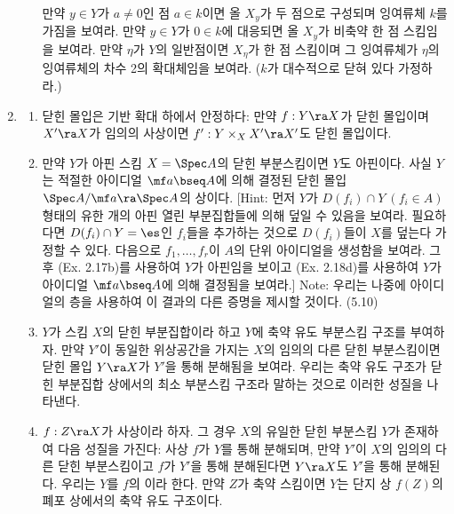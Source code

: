 \begin{enumerate}[label=\tb{3.\arabic*.},itemindent=0mm,itemsep=2mm]
\begin{enumerate}[label=(\alph*)]
	만약 $y\in Y$가 $a\ne 0$인 점 $a\in k$이면 올 $X_y$가 두 점으로 구성되며 잉여류체 $k$를 가짐을 보여라.
	만약 $y\in Y$가 $0\in k$에 대응되면 올 $X_y$가 비축약 한 점 스킴임을 보여라.
	만약 $\eta$가 $Y$의 일반점이면 $X_\eta$가 한 점 스킴이며 그 잉여류체가 $\eta$의 잉여류체의 차수 2의 확대체임을 보여라.
	($k$가 대수적으로 닫혀 있다 가정하라.)
	\end{enumerate}
	\item {}
	\begin{enumerate}[label=(\alph*)]
	\item 닫힌 몰입은 기반 확대 하에서 안정하다: 만약 $f:Y\ra X$가 닫힌 몰입이며 $X'\ra X$가 임의의 사상이면
	$f':Y\times_XX'\ra X'$도 닫힌 몰입이다.
	\end{enumerate}
	\begin{enumerate}[label=*(\alph*)]
	\setcounter{enumii}{1}
	\item 만약 $Y$가 아핀 스킴 $X=\Spec A$의 닫힌 부분스킴이면 $Y$도 아핀이다.
	사실 $Y$는 적절한 아이디얼 $\mf a\bseq A$에 의해 결정된 닫힌 몰입 $\Spec A/\mf a\ra\Spec A$의 상이다.
	[Hint: 먼저 $Y$가 $D(f_i)\cap Y\:(f_i\in A)$ 형태의 유한 개의 아핀 열린 부분집합들에 의해 덮일 수 있음을 보여라.
	필요하다면 $D(f_i)\cap Y=\es$인 $f_i$들을 추가하는 것으로 $D(f_i)$들이 $X$를 덮는다 가정할 수 있다.
	다음으로 $f_1,\ldots,f_r$이 $A$의 단위 아이디얼을 생성함을 보여라.
	그 후 (Ex. 2.17b)를 사용하여 $Y$가 아핀임을 보이고 (Ex. 2.18d)를 사용하여 $Y$가 아이디얼 $\mf a\bseq A$에 의해 결정됨을 보여라.]
	Note: 우리는 나중에 아이디얼의 층을 사용하여 이 결과의 다른 증명을 제시할 것이다. (5.10)
	\end{enumerate}
	\begin{enumerate}[label=(\alph*)]
	\setcounter{enumii}{2}
	\item $Y$가 스킴 $X$의 닫힌 부분집합이라 하고 $Y$에 축약 유도 부분스킴 구조를 부여하자.
	만약 $Y'$이 동일한 위상공간을 가지는 $X$의 임의의 다른 닫힌 부분스킴이면 닫힌 몰입 $Y\ra X$가 $Y'$을 통해 분해됨을 보여라.
	우리는 축약 유도 구조가 닫힌 부분집합 상에서의 최소 부분스킴 구조라 말하는 것으로 이러한 성질을 나타낸다.
	\item $f:Z\ra X$가 사상이라 하자. 그 경우 $X$의 유일한 닫힌 부분스킴 $Y$가 존재하여 다음 성질을 가진다:
	사상 $f$가 $Y$를 통해 분해되며, 만약 $Y'$이 $X$의 임의의 다른 닫힌 부분스킴이고 $f$가 $Y'$을 통해 분해된다면
	$Y\ra X$도 $Y'$을 통해 분해된다. 우리는 $Y$를 $f$의 이라 한다.
	만약 $Z$가 축약 스킴이면 $Y$는 단지 상 $f(Z)$의 폐포 상에서의 축약 유도 구조이다.
	\end{enumerate}

\end{enumerate}
